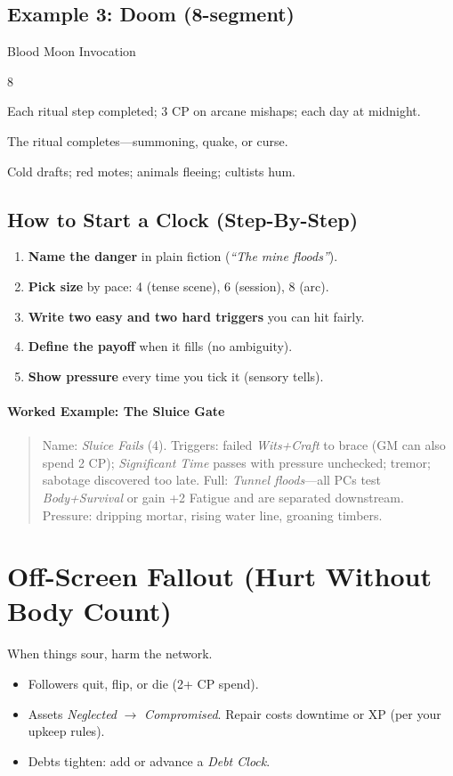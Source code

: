 \documentclass[12pt]{article}
\begin{document}
\subsection*{Example 3: Doom (8-segment)}
\begin{description}[leftmargin=2cm]
  \item[Name:] Blood Moon Invocation
  \item[Size:] 8
  \item[Fill Triggers:] Each ritual step completed; 3 CP on arcane mishaps; each day at midnight.
  \item[Full:] The ritual completes---summoning, quake, or curse.
  \item[Pressure:] Cold drafts; red motes; animals fleeing; cultists hum.
\end{description}

\subsection*{How to Start a Clock (Step-By-Step)}
\begin{enumerate}
  \item \textbf{Name the danger} in plain fiction (\emph{``The mine floods''}).
  \item \textbf{Pick size} by pace: 4 (tense scene), 6 (session), 8 (arc).
  \item \textbf{Write two easy and two hard triggers} you can hit fairly.
  \item \textbf{Define the payoff} when it fills (no ambiguity).
  \item \textbf{Show pressure} every time you tick it (sensory tells).
\end{enumerate}

\paragraph{Worked Example: The Sluice Gate}
\begin{quote}\small
Name: \emph{Sluice Fails} (4). Triggers: failed \emph{Wits+Craft} to brace (GM can also spend 2 CP); \emph{Significant Time} passes with pressure unchecked; tremor; sabotage discovered too late. Full: \emph{Tunnel floods}---all PCs test \emph{Body+Survival} or gain +2 Fatigue and are separated downstream. Pressure: dripping mortar, rising water line, groaning timbers.
\end{quote}

\section{Off-Screen Fallout (Hurt Without Body Count)}
When things sour, harm the network.
\begin{itemize}
  \item Followers quit, flip, or die (2+ CP spend).
  \item Assets \emph{Neglected} $\rightarrow$ \emph{Compromised}. Repair costs downtime or XP (per your upkeep rules).
  \item Debts tighten: add or advance a \emph{Debt Clock}.
\end{itemize}
\end{document}
